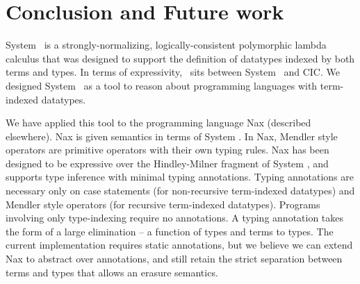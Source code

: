 \section{Conclusion and Future work}
\label{sec:concl}

System \Fi\ is a strongly-normalizing, logically-consistent
polymorphic lambda calculus that was designed to support the
definition of datatypes indexed by both terms and types.
In terms of expressivity, \Fi\ sits between System \Fw\ and CIC.
We designed System \Fi\ as a tool to reason about programming
languages with term-indexed datatypes. 

We have applied this tool to the programming language Nax (described elsewhere).
Nax is given semantics in terms of System \Fi . In Nax,
Mendler style operators are primitive operators with their
own typing rules. Nax has been designed to be expressive over
the Hindley-Milner fragment of System \Fi, and supports type
inference with minimal typing annotations. Typing annotations are
necessary only on case statements (for non-recursive term-indexed datatypes)
and Mendler style operators (for recursive term-indexed datatypes). Programs
involving only type-indexing require no annotations. A typing annotation
takes the form of a large elimination -- a function of types and terms to types.
The current implementation requires static annotations, but we believe we can extend
Nax to abstract over annotations, and still retain the strict separation between
terms and types that allows an erasure semantics.
 
